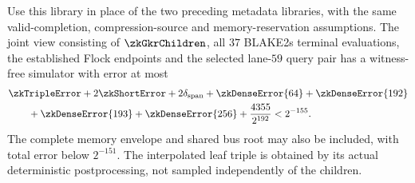 \begin{theorem}\label{thm:zk-flock-children-interface}
Use this library in place of the two preceding metadata libraries, with the same valid-completion, compression-source and memory-reservation assumptions. The joint view consisting of $\zkGkrChildren$, all $37$ BLAKE2s terminal evaluations, the established Flock endpoints and the selected lane-$59$ query pair has a witness-free simulator with error at most
\[
 \begin{aligned}
 &\zkTripleError+2\zkShortError+2\delta_{\mathrm{span}}
 +\zkDenseError{64}+\zkDenseError{192}\\
 &\hspace{2em}+\zkDenseError{193}+\zkDenseError{256}
 +\frac{4355}{2^{192}}<2^{-155}.
 \end{aligned}
\]
The complete memory envelope and shared bus root may also be included, with total error below $2^{-151}$. The interpolated leaf triple is obtained by its actual deterministic postprocessing, not sampled independently of the children.
\end{theorem}
